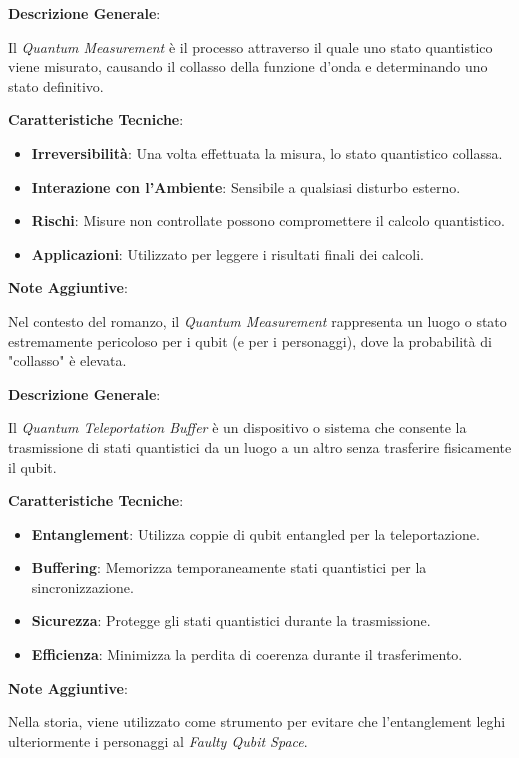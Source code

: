 \begin{tcolorbox}[colback=white,colframe=black,title=\textbf{Quantum Measurement}]
\begin{multicols}{2}
\textbf{Descrizione Generale}:

Il \emph{Quantum Measurement} è il processo attraverso il quale uno stato quantistico viene misurato, causando il collasso della funzione d'onda e determinando uno stato definitivo.

\textbf{Caratteristiche Tecniche}:
\begin{itemize}
    \item \textbf{Irreversibilità}: Una volta effettuata la misura, lo stato quantistico collassa.
    \item \textbf{Interazione con l'Ambiente}: Sensibile a qualsiasi disturbo esterno.
    \item \textbf{Rischi}: Misure non controllate possono compromettere il calcolo quantistico.
    \item \textbf{Applicazioni}: Utilizzato per leggere i risultati finali dei calcoli.
\end{itemize}

\textbf{Note Aggiuntive}:

Nel contesto del romanzo, il \emph{Quantum Measurement} rappresenta un luogo o stato estremamente pericoloso per i qubit (e per i personaggi), dove la probabilità di "collasso" è elevata.

\end{multicols}
\end{tcolorbox}

\vspace{0.5cm}

\begin{tcolorbox}[colback=white,colframe=black,title=\textbf{Quantum Teleportation Buffer}]
\begin{multicols}{2}
\textbf{Descrizione Generale}:

Il \emph{Quantum Teleportation Buffer} è un dispositivo o sistema che consente la trasmissione di stati quantistici da un luogo a un altro senza trasferire fisicamente il qubit.

\textbf{Caratteristiche Tecniche}:
\begin{itemize}
    \item \textbf{Entanglement}: Utilizza coppie di qubit entangled per la teleportazione.
    \item \textbf{Buffering}: Memorizza temporaneamente stati quantistici per la sincronizzazione.
    \item \textbf{Sicurezza}: Protegge gli stati quantistici durante la trasmissione.
    \item \textbf{Efficienza}: Minimizza la perdita di coerenza durante il trasferimento.
\end{itemize}

\textbf{Note Aggiuntive}:

Nella storia, viene utilizzato come strumento per evitare che l'entanglement leghi ulteriormente i personaggi al \emph{Faulty Qubit Space}.

\end{multicols}
\end{tcolorbox}


